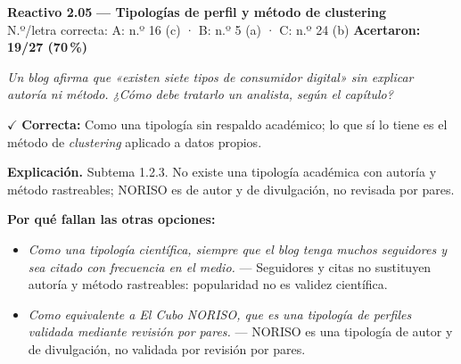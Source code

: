 \documentclass[10pt,letterpaper]{article}
\begin{document}
\begin{minipage}{\textwidth}
{\color{guinda}\textbf{Reactivo 2.05}} \textbf{— Tipologías de perfil y método de clustering}\\[-1pt]
{\scriptsize N.º/letra correcta: A: n.º 16 (c) · B: n.º 5 (a) · C: n.º 24 (b) \hfill \textbf{Acertaron: 19/27 (70\,\%)}}

\textit{Un blog afirma que «existen siete tipos de consumidor digital» sin explicar autoría ni método. ¿Cómo debe tratarlo un analista, según el capítulo?}

\textcolor{verde}{$\checkmark$} \textbf{Correcta:} Como una tipología sin respaldo académico; lo que sí lo tiene es el método de \textit{clustering} aplicado a datos propios.

\textbf{Explicación.} Subtema 1.2.3. No existe una tipología académica con autoría y método rastreables; NORISO es de autor y de divulgación, no revisada por pares.

\textbf{Por qué fallan las otras opciones:}
\begin{itemize}[itemsep=0pt,topsep=1pt,leftmargin=1.3em,parsep=0pt]
\item[\textcolor{rojo}{$\times$}] \textit{Como una tipología científica, siempre que el blog tenga muchos seguidores y sea citado con frecuencia en el medio.} --- Seguidores y citas no sustituyen autoría y método rastreables: popularidad no es validez científica.
\item[\textcolor{rojo}{$\times$}] \textit{Como equivalente a \textit{El Cubo NORISO}, que es una tipología de perfiles validada mediante revisión por pares.} --- NORISO es una tipología de autor y de divulgación, no validada por revisión por pares.
\end{itemize}
\end{minipage}\par\vspace{5pt}{\color{gray!40}\hrule}\vspace{5pt}
\end{document}
